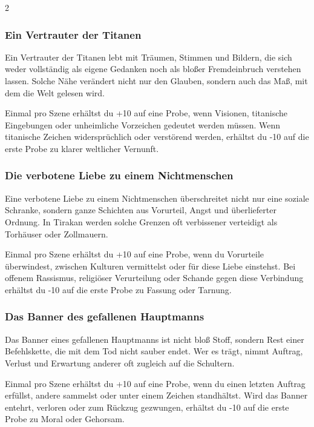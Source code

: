 {\begin{multicols*}{2}
        \subsubsection*{Ein Vertrauter der Titanen}
        Ein Vertrauter der Titanen lebt mit Träumen, Stimmen und Bildern, die sich weder vollständig als eigene Gedanken noch als bloßer Fremdeinbruch verstehen lassen. Solche Nähe verändert nicht nur den Glauben, sondern auch das Maß, mit dem die Welt gelesen wird.

        \bindungspielwertebox
        {Einmal pro Szene erhältst du +10 auf eine Probe, wenn Visionen, titanische Eingebungen oder unheimliche Vorzeichen gedeutet werden müssen.}
        {Wenn titanische Zeichen widersprüchlich oder verstörend werden, erhältst du -10 auf die erste Probe zu klarer weltlicher Vernunft.}

        \subsubsection*{Die verbotene Liebe zu einem Nichtmenschen}
        Eine verbotene Liebe zu einem Nichtmenschen überschreitet nicht nur eine soziale Schranke, sondern ganze Schichten aus Vorurteil, Angst und überlieferter Ordnung. In Tirakan werden solche Grenzen oft verbissener verteidigt als Torhäuser oder Zollmauern.

        \bindungspielwertebox
        {Einmal pro Szene erhältst du +10 auf eine Probe, wenn du Vorurteile überwindest, zwischen Kulturen vermittelst oder für diese Liebe einstehst.}
        {Bei offenem Rassismus, religiöser Verurteilung oder Schande gegen diese Verbindung erhältst du -10 auf die erste Probe zu Fassung oder Tarnung.}

        \subsubsection*{Das Banner des gefallenen Hauptmanns}
        Das Banner eines gefallenen Hauptmanns ist nicht bloß Stoff, sondern Rest einer Befehlskette, die mit dem Tod nicht sauber endet. Wer es trägt, nimmt Auftrag, Verlust und Erwartung anderer oft zugleich auf die Schultern.

        \bindungspielwertebox
        {Einmal pro Szene erhältst du +10 auf eine Probe, wenn du einen letzten Auftrag erfüllst, andere sammelst oder unter einem Zeichen standhältst.}
        {Wird das Banner entehrt, verloren oder zum Rückzug gezwungen, erhältst du -10 auf die erste Probe zu Moral oder Gehorsam.}


\end{multicols*}}
